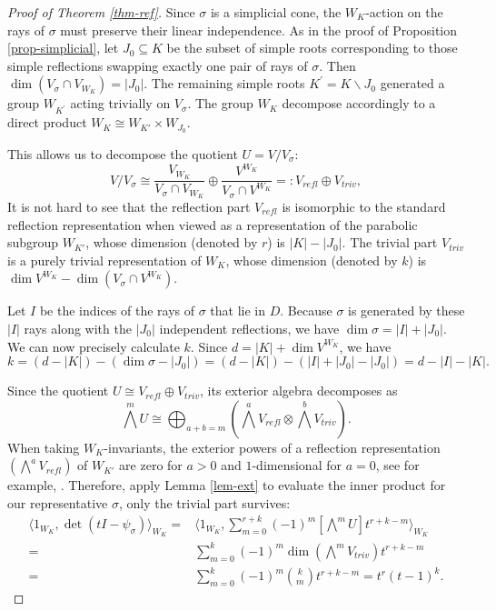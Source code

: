 \documentclass{amsart}
\theoremstyle{definition}
\theoremstyle{remark}
\numberwithin{equation}{section}
\begin{document}
\begin{proof}[Proof of Theorem \ref{thm-ref}]
Since $\sigma$ is a simplicial cone, the $W_K$-action on the rays of $\sigma$ must preserve their linear independence. As in the proof of Proposition \ref{prop-simplicial}, let $J_0 \subseteq K$ be the subset of simple roots corresponding to those simple reflections swapping exactly one pair of rays of $\sigma$. Then $\operatorname{dim}\left(V_\sigma \cap V_{W_K}\right)=\left|J_0\right|$. The remaining simple roots $K^{\prime}=K \backslash J_0$ generated a group $W_{K^{\prime}}$ acting trivially on $V_\sigma$. The group $W_K$ decompose accordingly to a direct product $W_K\cong W_{K'}\times W_{J_0}$.

This allows us to decompose the quotient $U = V/V_\sigma$:
$$V/V_\sigma \cong \frac{V_{W_K}}{V_\sigma \cap V_{W_K}} \oplus \frac{V^{W_K}}{V_\sigma \cap V^{W_K}} =: V_{refl} \oplus V_{triv},$$
It is not hard to see that the reflection part $V_{refl}$ is isomorphic to the standard reflection representation when viewed as a representation of the parabolic subgroup $W_{K'}$, whose dimension (denoted by $r$) is $|K| - |J_0|$. The trivial part $V_{triv}$ is a purely trivial representation of $W_K$, whose dimension (denoted by $k$) is $\dim V^{W_K} - \dim(V_\sigma \cap V^{W_K})$. 

Let $I$ be the indices of the rays of $\sigma$ that lie in $D$. Because $\sigma$ is generated by these $|I|$ rays along with the $|J_0|$ independent reflections, we have $\dim \sigma = |I| + |J_0|$.
We can now precisely calculate $k$. Since $d = |K| + \dim V^{W_K}$, we have
$$k = (d - |K|) - (\dim \sigma - |J_0|) = (d - |K|) - (|I| + |J_0| - |J_0|) = d - |I| - |K|.$$

Since the quotient $U \cong V_{refl} \oplus V_{triv}$, its exterior algebra decomposes as
\begin{equation}
    \bigwedge^m U \cong \bigoplus_{a+b=m} \left( \bigwedge^a V_{refl} \otimes \bigwedge^b V_{triv} \right).
\end{equation}
When taking $W_K$-invariants, the exterior powers of a reflection representation $\left( \bigwedge^a V_{refl} \right)$ of ${W_{K'}}$ are zero for $a > 0$ and $1$-dimensional for $a = 0$, see for example, \cite[Exercise 3(a), p.127]{Bourbaki-Lie456}. Therefore, apply Lemma \ref{lem-ext} to evaluate the inner product for our representative $\sigma$,  only the trivial part survives:
\begin{equation}
    \begin{aligned}
\langle 1_{W_K}, \operatorname{det}(tI - \psi_\sigma) \rangle_{W_K} =& \langle 1_{W_K}, \sum_{m= 0}^{r+k}(-1)^{m}\left[\bigwedge^{m} U\right] t^{r+k-m} \rangle_{W_K} \\=&\sum_{m=0}^k (-1)^m \dim\left( \bigwedge^m V_{triv} \right) t^{r + k - m}\\     
=& \sum_{m=0}^k (-1)^m \binom{k}{m} t^{r+k-m} = t^r (t-1)^k.
    \end{aligned}
\end{equation}


\end{proof}
\end{document}
